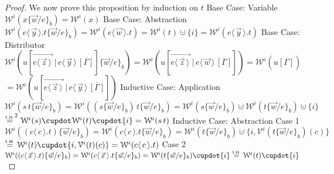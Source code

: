 \documentclass[a4paper,UKenglish,cleveref, autoref]{lipics-v2019}
\newcommand{\set}[1]{ \{ #1 \} }
\newcommand{\app}[2]{#1 \, #2}
\newcommand{\fake}[3]{#1 \langle \, #2 \, \rangle . #3}
\newcommand{\dist}[5]{#1 [ #2 \, \vert \, \fakedist{#4}{#5} \, #3 ]}
\newcommand{\fakedist}[2]{#1 \langle \, #2 \, \rangle}
\newcommand{\vecdist}[2]{\overrightarrow{\fakedist{#1}{#2} \,}}
\newcommand{\psub}[3]{#1 \{ #2 / #3 \}_{b}}
\newcommand{\weight}[2]{\mathcal{W}^{#1}(#2)}
\newcommand{\weightvar}[2]{\mathcal{V}^{#1}(#2)}
\newcommand{\IH}{\stackrel{\hbox{\tiny I.H.}}{\hbox{=}}}
\begin{document}
\begin{proof}
\newline
\newline
We now prove this proposition by induction on $t$
\newline
{ Base Case: Variable}
\newline
$\weight{i}{\psub{x}{\vec{w}}{e}} = \weight{i}{x}$
\newline
\newline
{ Base Case: Abstraction}
\newline
$\weight{i}{\fake{e}{\vec{y}}{t} \psub{}{\vec{w}}{e}} = \weight{i}{\fake{e}{\vec{w}}{t}} = \weight{i}{t} \cupdot \set{i} = \weight{i}{\fake{e}{\vec{y}}{t}}$
\newline
\newline
{ Base Case: Distributor}
\newline
$\weight{i}{\dist{u}{\vecdist{e}{\vec{z}}}{\overline{[\Gamma]}}{e}{\vec{y}} \psub{}{\vec{w}}{e}} = \weight{i}{\dist{u}{\vecdist{e}{\vec{z}}}{\overline{[\Gamma]}}{e}{\vec{w}}} = \weight{i}{u\overline{[\Gamma]}}$
\newline
$ = \weight{i}{\dist{u}{\vecdist{e}{\vec{z}}}{\overline{[\Gamma]}}{e}{\vec{y}}}$
\newline
\newline
{ Inductive Case: Application}
\newline
$\weight{i}{\app{s}{t} \psub{}{\vec{w}}{e}} = \weight{i}{\app{(s \psub{}{\vec{w}}{e})}{t \psub{}{\vec{w}}{e}}} = \weight{i}{s \psub{}{\vec{w}}{e}} \cupdot \weight{i}{t \psub{}{\vec{w}}{e}} \cupdot \set{i}$
\newline
$\IH^{2} \weight{i}{s} \cupdot \weight{i}{t} \cupdot \set{i} = \weight{i}{\app{s}{t}}$
\newline
\newline
{ Inductive Case: Abstraction}
\newline
Case 1
\newline
$\weight{i}{(\fake{c}{c}{t}) \psub{}{\vec{w}}{e}} = \weight{i}{\fake{c}{c}{t \psub{}{\vec{w}}{e}}} = \weight{i}{t \psub{}{\vec{w}}{e}} \cupdot \set{i, \weightvar{i}{t \psub{}{\vec{w}}{e}}(c)}$
\newline
$\IH \weight{i}{t} \cupdot \set{i, \weightvar{i}{t}(c)} = \weight{i}{\fake{c}{c}{t}}$
\newline
Case 2
\newline
$\weight{i}{(\fake{c}{\vec{x}}{t}) \psub{}{\vec{w}}{e}} = \weight{i}{\fake{c}{\vec{x}}{t \psub{}{\vec{w}}{e}}} = \weight{i}{t \psub{}{\vec{w}}{e}} \cupdot \set{i} \IH \weight{i}{t} \cupdot \set{i}$
\newline

\end{proof}
\end{document}

